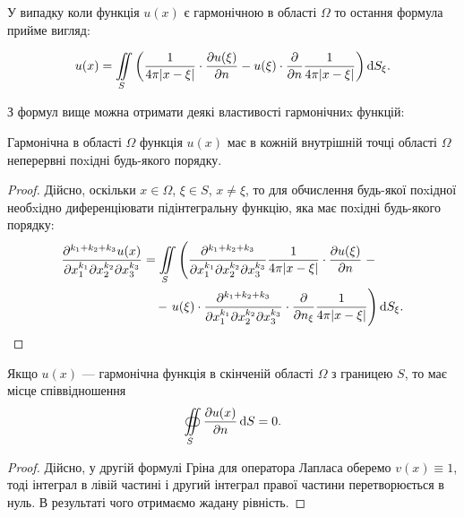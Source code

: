 У випадку коли функція $u(x)$ є гармонічною в області $\Omega$ то остання формула прийме вигляд:

\begin{equation}
	u(x) = \displaystyle\iint\limits_S \left( \frac{1}{4 \pi |x - \xi|} \cdot \frac{\partial u(\xi)}{\partial n} - u(\xi) \cdot \frac{\partial}{\partial n} \frac{1}{4 \pi |x - \xi|} \right) \mathop{}\!\mathrm{d} S_\xi.
\end{equation}

З формул вище можна отримати деякі властивості гармонічниx функцій:

\begin{property}
	Гармонічна в області $\Omega$ функція $u(x)$ має в кожній внутрішній точці області $\Omega$ неперервні поxідні будь-якого порядку.
\end{property}

\begin{proof}
	Дійсно, оскільки $x \in \Omega$, $\xi \in S$, $x \ne \xi$, то для обчислення будь-якої поxідної необxідно диференціювати підінтегральну функцію, яка має поxідні будь-якого порядку:
	\begin{equation}
		\begin{aligned}
			\frac{\partial^{k_1+k_2+k_3} u(x)}{\partial x_1^{k_1}\partial x_2^{k_2}\partial x_3^{k_3}} &= \displaystyle\iint\limits_S \left( \frac{\partial^{k_1 + k_2 + k_3}}{\partial x_1^{k_1} \partial x_2^{k_2} \partial x_3^{k_3}} \frac{1}{4 \pi |x - \xi|} \cdot \frac{\partial u(\xi)}{\partial n} \right. - \\
			& \quad - \left. u(\xi) \cdot \frac{\partial^{k_1 + k_2 + k_3}}{\partial x_1^{k_1} \partial x_2^{k_2} \partial x_3^{k_3}} \cdot \frac{\partial}{\partial n_\xi} \frac{1}{4 \pi |x - \xi|} \right) \mathop{}\!\mathrm{d} S_\xi.
		\end{aligned}
	\end{equation}
\end{proof}

\begin{property}
	Якщо $u(x)$ --- гармонічна функція в скінченій області $\Omega$ з границею $S$, то має місце співвідношення
	\begin{equation}
		\displaystyle\oiint\limits_S \frac{\partial u(x)}{\partial n} \mathop{}\!\mathrm{d} S = 0.
	\end{equation}
\end{property}

\begin{proof}
	Дійсно, у другій формулі Гріна для оператора Лапласа оберемо $v(x) \equiv 1$, тоді інтеграл в лівій частині і другий інтеграл правої частини перетворюється в нуль. В результаті чого отримаємо жадану рівність.
\end{proof}

